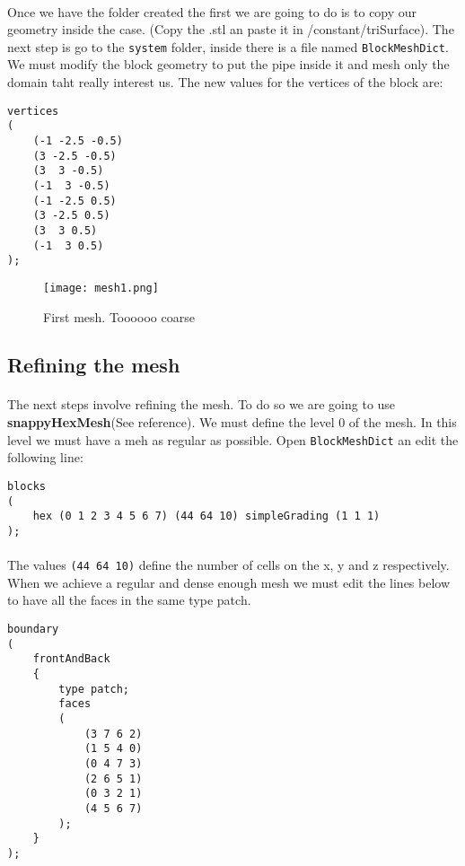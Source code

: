 \paragraph{}Once we have the folder created the first we are going to do is to copy our geometry inside the case. (Copy the .stl an paste it in /constant/triSurface). The next step is  go to the  \texttt{system} folder, inside there is a file named \texttt{BlockMeshDict}. We must modify the block geometry to put the pipe inside it and mesh only the domain taht really interest us. The new values for the vertices of the block are:
\begin{center}
\begin{lstlisting}
vertices
(
    (-1 -2.5 -0.5)
    (3 -2.5 -0.5)
    (3  3 -0.5)
    (-1  3 -0.5)
    (-1 -2.5 0.5)
    (3 -2.5 0.5)
    (3  3 0.5)
    (-1  3 0.5)
);
\end{lstlisting}
\end{center}
\begin{figure}[h!]
\centering
\texttt{[image: mesh1.png]}
\caption{First mesh. Toooooo coarse}
\end{figure}

\subsection{Refining the mesh}
\paragraph{}The next steps involve refining the mesh. To do so we are going to use \textbf{snappyHexMesh}(See reference). We must define the level 0 of the mesh. In this level we must have a meh as regular as possible. Open \texttt{BlockMeshDict} an edit the following line:
\begin{center}
\begin{lstlisting}
blocks
(
    hex (0 1 2 3 4 5 6 7) (44 64 10) simpleGrading (1 1 1)
);
\end{lstlisting}
\end{center}
\paragraph{}The values \lstinline!(44 64 10)! define the number of cells on the x, y and z respectively. When we achieve a regular and dense enough mesh we must edit the lines below to have all the faces in the same type patch.
\begin{center}
\begin{lstlisting}
boundary
(
    frontAndBack
    {
        type patch;
        faces
        (
            (3 7 6 2)
            (1 5 4 0)
            (0 4 7 3)
            (2 6 5 1)
            (0 3 2 1)
            (4 5 6 7)
        );
    }
);
\end{lstlisting}
\end{center}
